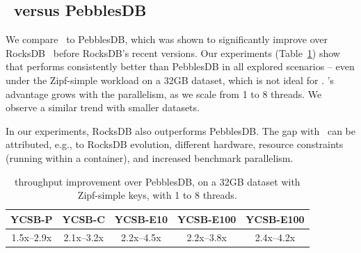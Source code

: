 \subsection{\sys\ versus PebblesDB}
\label{ssec:pebbles} 

We compare \sys\ to PebblesDB, which was shown to significantly improve over RocksDB~\cite{PebblesDB}
before RocksDB's recent versions.  Our experiments (Table~\ref{fig:pebbels-throughput}) show 
that \sys\/ performs consistently better than PebblesDB in all explored scenarios -- even under the Zipf-simple 
workload on a 32GB dataset, which is not ideal for \sys. \sys's advantage grows with the parallelism, as we scale 
from 1 to 8 threads. We observe a similar trend with smaller datasets. 

In our experiments, RocksDB also outperforms PebblesDB. The gap with~\cite{PebblesDB} 
can be attributed, e.g., to RocksDB evolution, different hardware, resource constraints (running within a 
container), and increased benchmark parallelism.   

\begin{table}
\centering
{\small{
\begin{tabular}{|c|c|c|c|c|}
\hline 
YCSB-P & YCSB-C & YCSB-E10 & YCSB-E100 & YCSB-E100 \\
\hline 
1.5x--2.9x & 2.1x--3.2x & 2.2x--4.5x & 2.2x--3.8x & 2.4x--4.2x \\
\hline 
\end{tabular}
}}
\caption{{\sys\/ throughput improvement over PebblesDB, on a 32GB dataset with Zipf-simple keys, with 1 to 8 threads.}}
\label{fig:pebbels-throughput}
\end{table}




  
